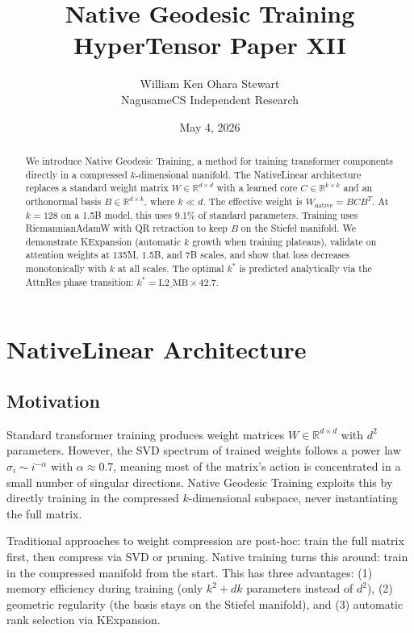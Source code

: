 \documentclass[11pt,a4paper]{article}
\title{Native Geodesic Training\\\large HyperTensor Paper XII}
\author{William Ken Ohara Stewart\\NagusameCS Independent Research}
\date{May 4, 2026}
\begin{document}
\maketitle

\begin{abstract}
We introduce Native Geodesic Training, a method for training transformer components directly in a compressed $k$-dimensional manifold. The NativeLinear architecture replaces a standard weight matrix $W \in \mathbb{R}^{d \times d}$ with a learned core $C \in \mathbb{R}^{k \times k}$ and an orthonormal basis $B \in \mathbb{R}^{d \times k}$, where $k \ll d$. The effective weight is $W_{\mathrm{native}} = B C B^T$. At $k=128$ on a 1.5B model, this uses 9.1\% of standard parameters. Training uses RiemannianAdamW with QR retraction to keep $B$ on the Stiefel manifold. We demonstrate KExpansion (automatic $k$ growth when training plateaus), validate on attention weights at 135M, 1.5B, and 7B scales, and show that loss decreases monotonically with $k$ at all scales. The optimal $k^*$ is predicted analytically via the AttnRes phase transition: $k^* = \mathrm{L2\_MB} \times 42.7$.
\end{abstract}

\section{NativeLinear Architecture}

\subsection{Motivation}
Standard transformer training produces weight matrices $W \in \mathbb{R}^{d \times d}$ with $d^2$ parameters. However, the SVD spectrum of trained weights follows a power law $\sigma_i \sim i^{-\alpha}$ with $\alpha \approx 0.7$, meaning most of the matrix's action is concentrated in a small number of singular directions. Native Geodesic Training exploits this by directly training in the compressed $k$-dimensional subspace, never instantiating the full matrix.

Traditional approaches to weight compression are post-hoc: train the full matrix first, then compress via SVD or pruning. Native training turns this around: train in the compressed manifold from the start. This has three advantages: (1) memory efficiency during training (only $k^2 + dk$ parameters instead of $d^2$), (2) geometric regularity (the basis stays on the Stiefel manifold), and (3) automatic rank selection via KExpansion.
\end{document}
